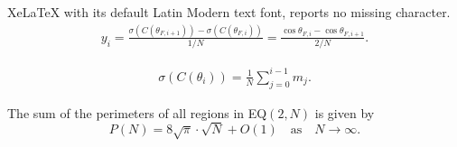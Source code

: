 \documentclass[10pt,a4paper]{amsart}
\begin{document}
XeLaTeX with its default Latin Modern text font, reports no missing character.
\begin{align}\label{def y_i}
    y_i=\frac{\sigma(C(\theta_{F,i+1}))-\sigma(C(\theta_{F,i}))}{1/N}=\frac{\cos\theta_{F,i}-\cos\theta_{F,i+1}}{2/N}.
\end{align}

\begin{align}\label{def theta}
    \sigma(C(\theta_i))=\frac{1}{N}\sum_{j=0}^{i-1}m_j.
\end{align}

\begin{lemma}\label{total perimeter}
    The sum of the perimeters of all regions in EQ$(2,N)$ is given by 
    $$P(N)=8\sqrt{\pi}\cdot\sqrt{N}+O(1) \quad \text{as}\quad N\rightarrow\infty.$$
\end{lemma}
\end{document}
